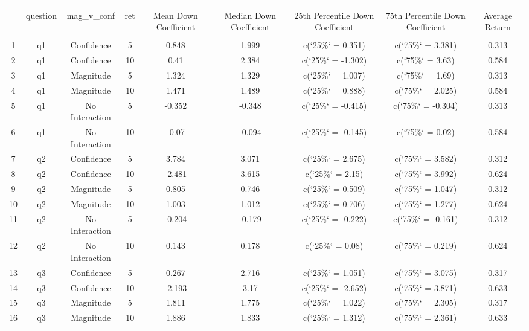 
\begin{table}[!htbp] \centering 
  \caption{} 
  \label{} 
\begin{tabular}{@{\extracolsep{5pt}} ccccccccc} 
\\[-1.8ex]\hline 
\hline \\[-1.8ex] 
 & question & mag\_v\_conf & ret & Mean Down Coefficient & Median Down Coefficient & 25th Percentile Down Coefficient & 75th Percentile Down Coefficient & Average Return \\ 
\hline \\[-1.8ex] 
1 & q1 & Confidence & 5 & 0.848 & 1.999 & c(`25\%` = 0.351) & c(`75\%` = 3.381) & 0.313 \\ 
2 & q1 & Confidence & 10 & 0.41 & 2.384 & c(`25\%` = -1.302) & c(`75\%` = 3.63) & 0.584 \\ 
3 & q1 & Magnitude & 5 & 1.324 & 1.329 & c(`25\%` = 1.007) & c(`75\%` = 1.69) & 0.313 \\ 
4 & q1 & Magnitude & 10 & 1.471 & 1.489 & c(`25\%` = 0.888) & c(`75\%` = 2.025) & 0.584 \\ 
5 & q1 & No Interaction & 5 & -0.352 & -0.348 & c(`25\%` = -0.415) & c(`75\%` = -0.304) & 0.313 \\ 
6 & q1 & No Interaction & 10 & -0.07 & -0.094 & c(`25\%` = -0.145) & c(`75\%` = 0.02) & 0.584 \\ 
7 & q2 & Confidence & 5 & 3.784 & 3.071 & c(`25\%` = 2.675) & c(`75\%` = 3.582) & 0.312 \\ 
8 & q2 & Confidence & 10 & -2.481 & 3.615 & c(`25\%` = 2.15) & c(`75\%` = 3.992) & 0.624 \\ 
9 & q2 & Magnitude & 5 & 0.805 & 0.746 & c(`25\%` = 0.509) & c(`75\%` = 1.047) & 0.312 \\ 
10 & q2 & Magnitude & 10 & 1.003 & 1.012 & c(`25\%` = 0.706) & c(`75\%` = 1.277) & 0.624 \\ 
11 & q2 & No Interaction & 5 & -0.204 & -0.179 & c(`25\%` = -0.222) & c(`75\%` = -0.161) & 0.312 \\ 
12 & q2 & No Interaction & 10 & 0.143 & 0.178 & c(`25\%` = 0.08) & c(`75\%` = 0.219) & 0.624 \\ 
13 & q3 & Confidence & 5 & 0.267 & 2.716 & c(`25\%` = 1.051) & c(`75\%` = 3.075) & 0.317 \\ 
14 & q3 & Confidence & 10 & -2.193 & 3.17 & c(`25\%` = -2.652) & c(`75\%` = 3.871) & 0.633 \\ 
15 & q3 & Magnitude & 5 & 1.811 & 1.775 & c(`25\%` = 1.022) & c(`75\%` = 2.305) & 0.317 \\ 
16 & q3 & Magnitude & 10 & 1.886 & 1.833 & c(`25\%` = 1.312) & c(`75\%` = 2.361) & 0.633 \\ 

\end{tabular}
\end{table}
